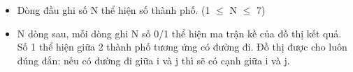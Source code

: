 \begin{itemize}
	\item     Dòng đầu ghi số N thể hiện số thành phố. (1  $\le$  N  $\le$  7)   
\end{itemize}
\begin{itemize}
	\item     N dòng sau, mỗi dòng ghi N số 0/1 thể hiện ma trận kề của đồ thị kết quả. Số 1 thể hiện giữa 2 thành phố tương ứng có đường đi. Đồ thị được cho luôn đúng đắn: nếu có đường đi giữa i và j thì sẽ có cạnh giữa i và j.   
\end{itemize}